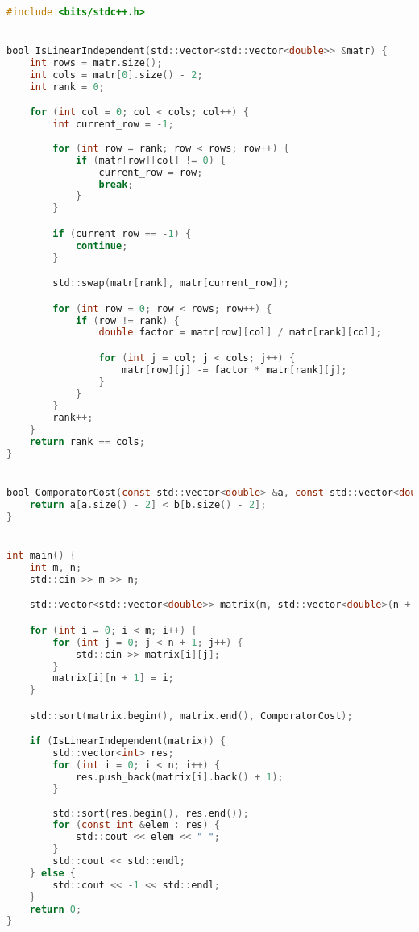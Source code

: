 \begin{lstlisting}[language=C]
#include <bits/stdc++.h>


bool IsLinearIndependent(std::vector<std::vector<double>> &matr) {
    int rows = matr.size();
    int cols = matr[0].size() - 2;
    int rank = 0;

    for (int col = 0; col < cols; col++) {
        int current_row = -1;
        
        for (int row = rank; row < rows; row++) {
            if (matr[row][col] != 0) {
                current_row = row;
                break;
            }
        }

        if (current_row == -1) {
            continue;
        }

        std::swap(matr[rank], matr[current_row]);

        for (int row = 0; row < rows; row++) {
            if (row != rank) {
                double factor = matr[row][col] / matr[rank][col];

                for (int j = col; j < cols; j++) {
                    matr[row][j] -= factor * matr[rank][j];
                }
            }
        }
        rank++;
    }
    return rank == cols;
}


bool ComporatorCost(const std::vector<double> &a, const std::vector<double> &b) {
    return a[a.size() - 2] < b[b.size() - 2];
}


int main() {
    int m, n;
    std::cin >> m >> n;

    std::vector<std::vector<double>> matrix(m, std::vector<double>(n + 2));

    for (int i = 0; i < m; i++) {
        for (int j = 0; j < n + 1; j++) {
            std::cin >> matrix[i][j];
        }
        matrix[i][n + 1] = i;
    }

    std::sort(matrix.begin(), matrix.end(), ComporatorCost);

    if (IsLinearIndependent(matrix)) {
        std::vector<int> res;
        for (int i = 0; i < n; i++) {
            res.push_back(matrix[i].back() + 1);
        }
    
        std::sort(res.begin(), res.end());
        for (const int &elem : res) {
            std::cout << elem << " ";
        }
        std::cout << std::endl;
    } else {
        std::cout << -1 << std::endl;
    }
    return 0;
}   
\end{lstlisting}


\pagebreak

